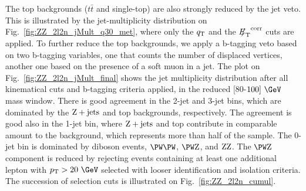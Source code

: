 The top backgrounds ($t\bar{t}$ and single-top) are also strongly reduced by the jet veto.  This is illustrated by the jet-multiplicity distribution on Fig.~\ref{fig:ZZ_2l2n_jMult_q30_met}, where only the $q_{\mathrm{T}}$  and the ${{E\!\!\!/}_{\mathrm{T}}}^{\mathrm{corr}}$ cuts are applied. To further reduce the top backgrounds, we apply a b-tagging veto based on two b-tagging variables, one that counts the number of displaced vertices, another one based on the presence of a soft muon in a jet.  The plot on Fig.~\ref{fig:ZZ_2l2n_jMult_final} shows the jet multiplicity distribution after all kinematical cuts and b-tagging criteria applied, in the reduced $[80$-$100]~\GeV$ mass window. There is good agreement in the 2-jet and 3-jet bins, which are dominated by the $\mathrm{Z}+\mathrm{jets}$ and top backgrounds, respectively. The agreement is good also in the 1-jet bin, where  $\mathrm{Z}+\mathrm{jets}$ and top contribute in comparable amount to the background, which represents more than half of the sample. The 0-jet bin is dominated by diboson events, $\WW$, $\WZ$, and $\mathrm{Z}\mathrm{Z}$. The $\WZ$ component is reduced by rejecting events containing at least one additional lepton with $\PT>20~\GeV$ selected with looser identification and isolation criteria.  The succession of selection cuts is illustrated on Fig.~\ref{fig:ZZ_2l2n_cumul}.

